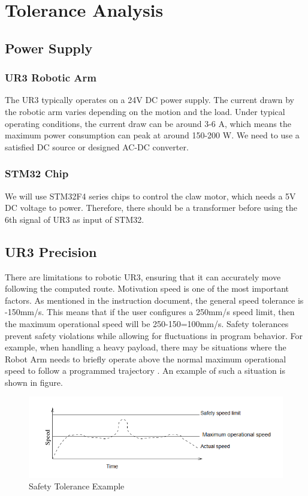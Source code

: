 \documentclass{senior-design}
\begin{document}
\section{Tolerance Analysis}
\subsection{Power Supply}
\subsubsection{UR3 Robotic Arm}
The UR3 typically operates on a 24V DC power supply. The current drawn by the robotic arm varies depending on the motion and the load. Under typical operating conditions, the current draw can be around 3-6 A, which means the maximum power consumption can peak at around 150-200 W. We need to use a satisfied DC source or designed AC-DC converter. 
\subsubsection{STM32 Chip}
We will use STM32F4 series chips to control the claw motor, which needs a 5V DC voltage to power. Therefore, there should be a transformer before using the 6th signal of UR3 as input of STM32.  
\subsection{UR3 Precision}
There are limitations to robotic UR3, ensuring that it can accurately move 
following the computed route. Motivation speed is one of the most important 
factors. As mentioned in the instruction document, the general speed tolerance 
is -150mm/s. This means that if the user conﬁgures a 250mm/s speed limit, then 
the maximum operational speed will be 250-150=100mm/s. Safety tolerances 
prevent safety violations while allowing for ﬂuctuations in program behavior. 
For example, when handling a heavy payload, there may be situations where the 
Robot Arm needs to brieﬂy operate above the normal maximum operational speed to 
follow a programmed trajectory \cite{ur3-manual}. An example of such a situation is shown in 
ﬁgure. 
\begin{figure}[H]
    \centering
    \includegraphics[width=0.8\linewidth]{UR3 Tolerance.png}
    \caption{Safety Tolerance Example}
\end{figure}
\end{document}
